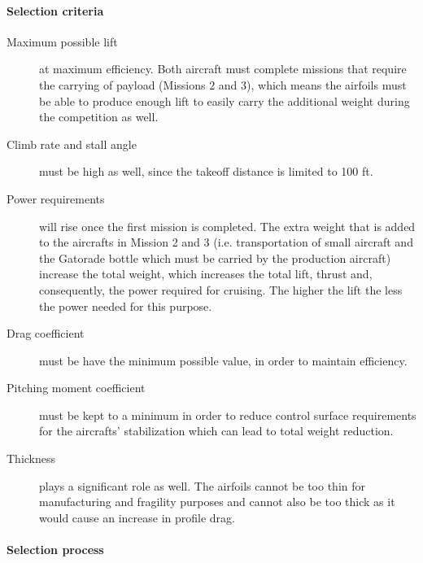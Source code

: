 \paragraph{Selection criteria}
\begin{description}
    \item  [Maximum possible lift] at maximum efficiency. Both aircraft must complete missions that require the carrying of payload (Missions 2 and 3), which means the airfoils must be able to produce enough lift to easily carry the additional weight during the competition as well.
    \item [Climb rate and stall angle] must be high as well, since the takeoff distance is limited to 100 ft.
    \item [Power requirements] will rise once the first mission is completed. The extra weight that is added to the aircrafts in Mission 2 and 3 (i.e. transportation of small aircraft and the Gatorade bottle which must be carried by the production aircraft) increase the total weight, which increases the total lift, thrust and, consequently, the power required for cruising. The higher the lift the less the power needed for this purpose.
    \item[Drag coefficient]  must be have the minimum possible value, in order to maintain efficiency.
    \item[Pitching moment coefficient] must be kept to a minimum in order to reduce control surface requirements for the aircrafts’ stabilization which can lead to total weight reduction.
    \item[Thickness] plays a significant role as well. The airfoils cannot be too thin for manufacturing and fragility purposes and cannot also be too thick as it would cause an increase in profile drag.
\end{description}

\paragraph{Selection process}

